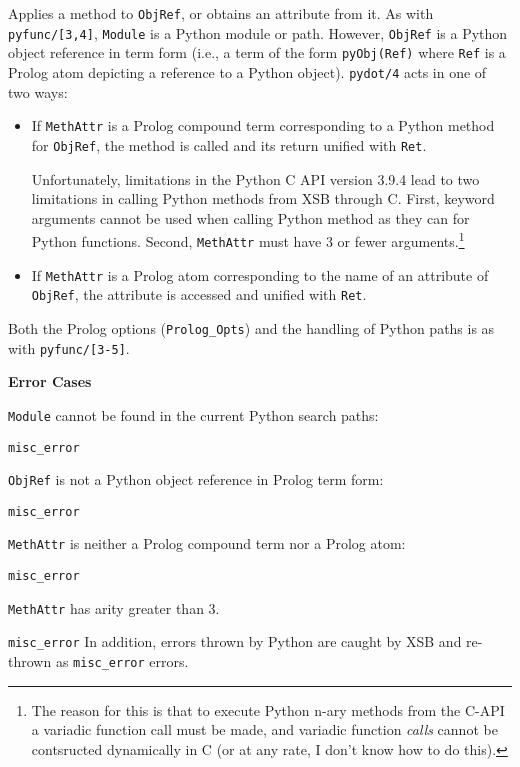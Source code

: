 \begin{description}
%
Applies a method to {\tt ObjRef}, or obtains an attribute from it.  As
with {\tt pyfunc/[3,4]}, {\tt Module} is a Python module or
path. However, {\tt ObjRef} is a Python object reference in term form
(i.e., a term of the form {\tt pyObj(Ref)} where {\tt Ref} is a Prolog
atom depicting a reference to a Python object). {\tt pydot/4} acts in
one of two ways:
\begin{itemize}
\item If {\tt MethAttr} is a Prolog compound term corresponding to a
  Python method for {\tt ObjRef}, the method is called and its return
  unified with {\tt Ret}.

  Unfortunately, limitations in the Python C API version 3.9.4 lead to
  two limitations in calling Python methods from XSB through C.
  First, keyword arguments cannot be used when calling Python method
  as they can for Python functions.  Second, {\tt MethAttr} must have
  3 or fewer arguments.\footnote{The reason for this is that to
    execute Python n-ary methods from the C-API a variadic function
    call must be made, and variadic function {\em calls} cannot be
    contsructed dynamically in C (or at any rate, I don't know how to
    do this).}
%
\item If {\tt MethAttr} is a Prolog atom corresponding to the name of
  an attribute of {\tt ObjRef}, the attribute is accessed and unified
  with {\tt Ret}.
\end{itemize}

Both the Prolog options ({\tt Prolog\_Opts}) and the handling of Python
paths is as with {\tt pyfunc/[3-5]}.

{\bf Error Cases}
\bi
\item {\tt Module} cannot be found in the current Python search paths:
\bi
\item {\tt misc\_error}
\ei
\item {\tt ObjRef} is not a Python object reference in Prolog term form:
\bi
\item {\tt misc\_error}
\ei
\item {\tt MethAttr} is neither a Prolog compound term nor a Prolog atom:
\bi
\item {\tt misc\_error}
\item {\tt MethAttr} has arity greater than 3.
\bi
\item {\tt misc\_error}
  \ei
  \ei \ei In addition, errors thrown by Python are
  caught by XSB and re-thrown as {\tt misc\_error} errors.


\end{description}
